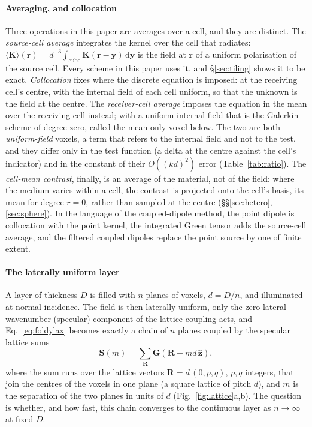 \documentclass[preprint,review,12pt]{elsarticle}
\newcommand{\bS}{\mathbf{S}}
\newcommand{\bK}{\mathbf{K}}
\newcommand{\bG}{\mathbf{G}}
\newcommand{\dd}{\mathrm{d}}
\begin{document}
\paragraph{Averaging, and collocation} Three operations in this paper are averages over a cell,
and they are distinct. The \emph{source-cell average} integrates the kernel over the cell that
radiates: $\langle\bK\rangle(\mathbf r)=d^{-3}\int_{\text{cube}}\bK(\mathbf r-\mathbf y)\,\dd\mathbf y$
is the field at $\mathbf r$ of a uniform polarisation of the source cell. Every scheme in this paper
uses it, and \S\ref{sec:tiling} shows it to be exact. \emph{Collocation} fixes where the discrete
equation is imposed: at the receiving cell's centre, with the internal field of each cell uniform, so
that the unknown is the field at the centre. The \emph{receiver-cell average} imposes the equation in
the mean over the receiving cell instead; with a uniform internal field that is the Galerkin scheme
of degree zero, called the mean-only voxel below. The two are both \emph{uniform-field} voxels, a
term that refers to the internal field and not to the test, and they differ only in the test
function (a delta at the centre against the cell's indicator) and in the constant of their
$O((kd)^2)$ error (Table~\ref{tab:ratio}). The \emph{cell-mean contrast}, finally, is an average of
the material, not of the field: where the medium varies within a cell, the contrast is projected
onto the cell's basis, its mean for degree $r=0$, rather than sampled at the centre
(\S\S\ref{sec:hetero}, \ref{sec:sphere}). In the language of the coupled-dipole method, the point
dipole is collocation with the point kernel, the integrated Green tensor adds the source-cell
average, and the filtered coupled dipoles replace the point source by one of finite extent.

\paragraph{The laterally uniform layer} A layer of thickness $D$ is filled with $n$ planes of
voxels, $d=D/n$, and illuminated at normal incidence. The field is then laterally uniform, only the
zero-lateral-wavenumber (specular) component of the lattice coupling acts, and
Eq.~\eqref{eq:foldylax} becomes exactly a chain of $n$ planes coupled by the specular lattice sums
\begin{equation}\label{eq:specsum}
  \bS(m)=\sum_{\mathbf R}\bG(\mathbf R+m d\,\hat{\mathbf z}),
\end{equation}
where the sum runs over the lattice vectors $\mathbf R=d\,(0,p,q)$, $p,q$ integers, that join the centres of
the voxels in one plane (a square lattice of pitch $d$), and $m$ is the separation of the two planes in
units of $d$ (Fig.~\ref{fig:lattice}a,b). The question is whether, and how fast, this chain converges to the
continuous layer as $n\to\infty$ at fixed $D$.
\end{document}
